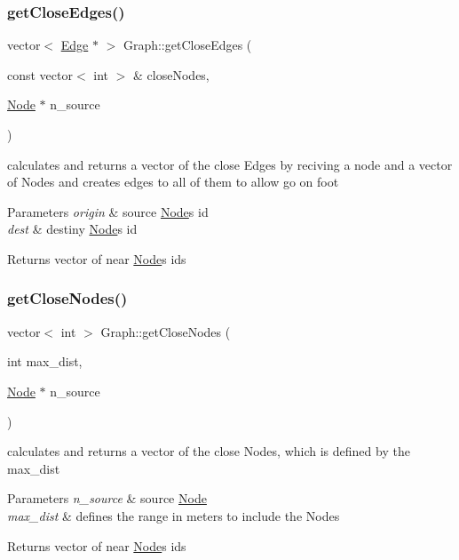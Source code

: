 \subsubsection{\texorpdfstring{get\+Close\+Edges()}{getCloseEdges()}}
{\footnotesize\ttfamily vector$<$ \hyperlink{class_edge}{Edge} $\ast$ $>$ Graph\+::get\+Close\+Edges (\begin{DoxyParamCaption}\item[{const vector$<$ int $>$ \&}]{close\+Nodes,  }\item[{\hyperlink{class_node}{Node} $\ast$}]{n\+\_\+source }\end{DoxyParamCaption})}



calculates and returns a vector of the close Edges by reciving a node and a vector of Nodes and creates edges to all of them to allow go on foot 


\begin{DoxyParams}{Parameters}
{\em origin} & source \hyperlink{class_node}{Node}\textquotesingle{}s id \\
\hline
{\em dest} & destiny \hyperlink{class_node}{Node}\textquotesingle{}s id \\
\hline
\end{DoxyParams}
\begin{DoxyReturn}{Returns}
vector of near \hyperlink{class_node}{Node}\textquotesingle{}s ids 
\end{DoxyReturn}
\mbox{\label{class_graph_aafb88743e904e0bd0021552d6e04aa78}} 
\subsubsection{\texorpdfstring{get\+Close\+Nodes()}{getCloseNodes()}}
{\footnotesize\ttfamily vector$<$ int $>$ Graph\+::get\+Close\+Nodes (\begin{DoxyParamCaption}\item[{int}]{max\+\_\+dist,  }\item[{\hyperlink{class_node}{Node} $\ast$}]{n\+\_\+source }\end{DoxyParamCaption})}



calculates and returns a vector of the close Nodes, which is defined by the max\+\_\+dist 


\begin{DoxyParams}{Parameters}
{\em n\+\_\+source} & source \hyperlink{class_node}{Node} \\
\hline
{\em max\+\_\+dist} & defines the range in meters to include the Nodes \\
\hline
\end{DoxyParams}
\begin{DoxyReturn}{Returns}
vector of near \hyperlink{class_node}{Node}\textquotesingle{}s ids 
\end{DoxyReturn}
\mbox{\label{class_graph_a24ab353dedffc675eda551aabb6e2ed1}} 
